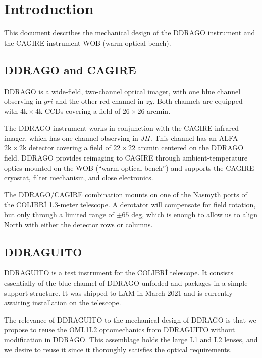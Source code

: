 \documentclass{report}
\begin{document}
\clearpage

\pagestyle{plain}

\tableofcontents
\clearpage

\listoffigures
\clearpage

\listoftables
\clearpage

\chapter{Introduction}

This document describes the mechanical design of the DDRAGO instrument and the CAGIRE instrument WOB (warm optical bench).

\section{DDRAGO and CAGIRE}

DDRAGO is a wide-field, two-channel optical imager, with one blue channel observing in $gri$ and the other red channel in $zy$. Both channels are equipped with $\mathrm{4k} \times \mathrm{4k}$ CCDs covering a field of $26\times26$ arcmin.

The DDRAGO instrument works in conjunction with the CAGIRE infrared imager, which has one channel observing in $JH$. This channel has an ALFA $\mathrm{2k}\times\mathrm{2k}$ detector covering a field of $22\times22$ arcmin centered on the DDRAGO field. DDRAGO provides reimaging to CAGIRE through ambient-temperature optics mounted on the WOB (“warm optical bench”) and supports the CAGIRE cryostat, filter mechanism, and close electronics.

The DDRAGO/CAGIRE combination mounts on one of the Nasmyth ports of the COLIBRÍ 1.3-meter telescope. A derotator will compensate for field rotation, but only through a limited range of $\pm65$ deg, which is enough to allow us to align North with either the detector rows or columns.

\section{DDRAGUITO}

DDRAGUITO is a test instrument for the COLIBRÍ telescope. It consists essentially of the blue channel of DDRAGO unfolded and packages in a simple support structure. It was shipped to LAM in March 2021 and is currently awaiting installation on the telescope.

The relevance of DDRAGUITO to the mechanical design of DDRAGO is that we propose to reuse the OML1L2 optomechanics from DDRAGUITO without modification in DDRAGO. This assemblage holds the large L1 and L2 lenses, and we desire to reuse it since it thoroughly satisfies the optical requirements.
\end{document}
